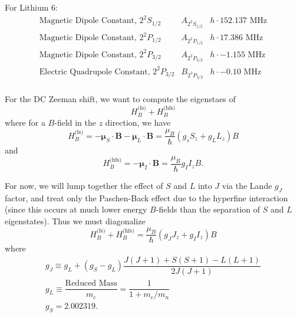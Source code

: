 \documentclass[aps,pra,preprint,groupedaddress]{revtex4}
\begin{document}
For Lithium 6:
\begin{equation}
\begin{array}{lll}
\text{Magnetic Dipole Constant, $2^2S_{1/2}$}&A_{2^2S_{1/2}}&h\cdot 152.137\text{ MHz}\\
\text{Magnetic Dipole Constant, $2^2P_{1/2}$}&A_{2^2P_{1/2}}&h\cdot 17.386\text{ MHz} \\
\text{Magnetic Dipole Constant, $2^2P_{3/2}$}&A_{2^2P_{3/2}}&h\cdot -1.155\text{ MHz}\\
\text{Electric Quadrupole Constant, $2^2P_{3/2}$}&B_{2^2P_{3/2}}&h\cdot -0.10\text{ MHz}\\
\end{array}
\end{equation}

For the DC Zeeman shift, we want to compute the eigenstaes of
\begin{equation}
H_B^\text{(fs)}+H_B^\text{(hfs)}
\end{equation}
where for a $B$-field in the $z$ direction, we have
\begin{equation}
H_B^\text{(fs)}=-\mathbf{\mu}_S\cdot \mathbf{B} - \mathbf{\mu}_L\cdot \mathbf{B}
=\dfrac{\mu_B}{\hbar}\left(g_s S_z+g_L L_z\right)B
\end{equation}
and
\begin{equation}
H_B^\text{(hfs)}=-\mathbf{\mu}_I\cdot \mathbf{B}=\dfrac{\mu_B}{\hbar}g_I I_z B.
\end{equation}

For now, we will lump together the effect of $S$ and $L$ into $J$ via the Lande $g_J$ factor, and treat only the Paschen-Back effect due to the hyperfine interaction (since this occurs at much lower energy $B$-fields than the separation of $S$ and $L$ eigenstates). Thus we must diagonalize
\begin{equation}
H_B^\text{(fs)}+H_B^\text{(hfs)}=\dfrac{\mu_B}{\hbar}\left( g_J J_z+g_I I_z\right)B
\end{equation}
where
\begin{equation}
\begin{array}{l}
g_J \equiv g_L + (g_S-g_L)\dfrac{J(J+1)+S(S+1)-L(L+1)}{2J(J+1)}\\
g_L \equiv \dfrac{\text{Reduced Mass}}{m_e}=\dfrac{1}{1+m_e/m_n} \\
g_S=2.002319.
\end{array}
\end{equation}
\end{document}
